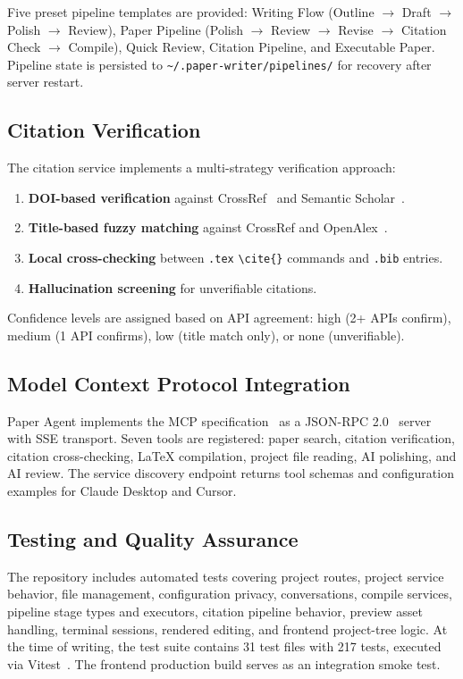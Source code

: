 \documentclass[11pt,a4paper]{article}
\newcommand{\software}{Paper Agent}
\begin{document}
Five preset pipeline templates are provided: Writing Flow (Outline $\to$ Draft
$\to$ Polish $\to$ Review), Paper Pipeline (Polish $\to$ Review $\to$ Revise
$\to$ Citation Check $\to$ Compile), Quick Review, Citation Pipeline, and
Executable Paper. Pipeline state is persisted to
\texttt{\textasciitilde/.paper-writer/pipelines/} for recovery after server
restart.

\subsection{Citation Verification}

The citation service implements a multi-strategy verification approach:
\begin{enumerate}
  \item \textbf{DOI-based verification} against CrossRef~\cite{crossrefapi}
  and Semantic Scholar~\cite{semanticscholarapi}.
  \item \textbf{Title-based fuzzy matching} against CrossRef and
  OpenAlex~\cite{openalex}.
  \item \textbf{Local cross-checking} between \texttt{.tex} \verb|\cite{}|
  commands and \texttt{.bib} entries.
  \item \textbf{Hallucination screening} for unverifiable citations.
\end{enumerate}

Confidence levels are assigned based on API agreement: high (2+ APIs confirm),
medium (1 API confirms), low (title match only), or none (unverifiable).

\subsection{Model Context Protocol Integration}

\software{} implements the MCP specification~\cite{modelcontextprotocol2024}
as a JSON-RPC 2.0~\cite{jsonrpc} server with SSE transport. Seven tools are
registered: paper search, citation verification, citation cross-checking,
\LaTeX{} compilation, project file reading, AI polishing, and AI review. The
service discovery endpoint returns tool schemas and configuration examples for
Claude Desktop and Cursor.

\subsection{Testing and Quality Assurance}

The repository includes automated tests covering project routes, project
service behavior, file management, configuration privacy, conversations,
compile services, pipeline stage types and executors, citation pipeline
behavior, preview asset handling, terminal sessions, rendered editing, and
frontend project-tree logic. At the time of writing, the test suite contains
31 test files with 217 tests, executed via Vitest~\cite{vitest}. The frontend
production build serves as an integration smoke test.
\end{document}
